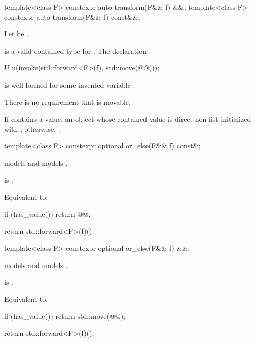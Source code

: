 %
\begin{itemdecl}
template<class F>
  constexpr auto transform(F&& f) &&;
template<class F>
  constexpr auto transform(F&& f) const&&;
\end{itemdecl}

\begin{itemdescr}
\pnum
Let  be .

\pnum
\mandates
{} is a valid contained type for . The declaration
\begin{codeblock}
U u(invoke(std::forward<F>(f), std::move(@@)));
\end{codeblock}
is well-formed for some invented variable .
\begin{note}
There is no requirement that  is movable.
\end{note}

\pnum
\returns
If  contains a value, an  object whose contained value is direct-non-list-initialized with ; otherwise, .
\end{itemdescr}

%
\begin{itemdecl}
template<class F>
  constexpr optional or_else(F&& f) const&;
\end{itemdecl}

\begin{itemdescr}
\pnum
\constraints
{} models  and  models .

\pnum
\mandates
{} is .

\pnum
\effects
Equivalent to:
\begin{codeblock}
if (has_value())
  return @@;

return std::forward<F>(f)();
\end{codeblock}
\end{itemdescr}

%
\begin{itemdecl}
template<class F>
  constexpr optional or_else(F&& f) &&;
\end{itemdecl}

\begin{itemdescr}
\pnum
\constraints
{} models  and  models .

\pnum
\mandates
{} is .

\pnum
\effects
Equivalent to:
\begin{codeblock}
if (has_value())
  return std::move(@@);

return std::forward<F>(f)();
\end{codeblock}
\end{itemdescr}

